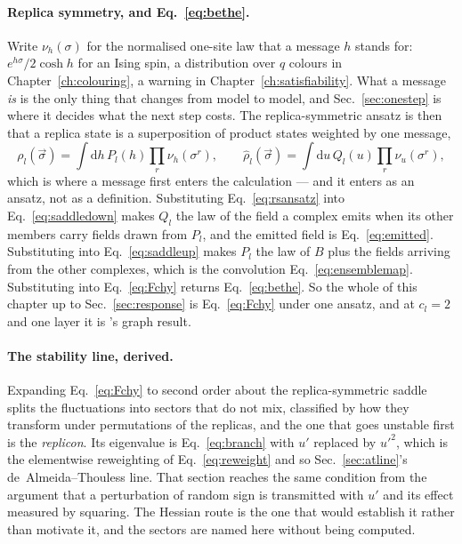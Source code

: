 \paragraph{Replica symmetry, and Eq.~\eqref{eq:bethe}.} Write
$\nu_{h}(\sigma)$ for the normalised one-site law that a message $h$ stands
for: $e^{h\sigma}/2\cosh h$ for an Ising spin, a distribution over $q$ colours
in Chapter~\ref{ch:colouring}, a warning in
Chapter~\ref{ch:satisfiability}. What a message \emph{is} is the only thing
that changes from model to model, and Sec.~\ref{sec:onestep} is where it decides
what the next step costs. The replica-symmetric ansatz is then that a replica
state is a superposition of product states weighted by one message,
\begin{equation}
  \rho_{l}(\vec\sigma)=\!\int\!\mathrm{d}h\,P_{l}(h)
    \prod_{r}\nu_{h}(\sigma^{r}),
  \qquad
  \hat\rho_{l}(\vec\sigma)=\!\int\!\mathrm{d}u\,Q_{l}(u)
    \prod_{r}\nu_{u}(\sigma^{r}),
  \label{eq:rsansatz}
\end{equation}
which is where a message first enters the calculation --- and it enters as an
ansatz, not as a definition. Substituting Eq.~\eqref{eq:rsansatz} into
Eq.~\eqref{eq:saddledown} makes $Q_{l}$ the law of the field a complex emits
when its other members carry fields drawn from $P_{l}$, and the emitted field is
Eq.~\eqref{eq:emitted}. Substituting into Eq.~\eqref{eq:saddleup} makes $P_{l}$
the law of $B$ plus the fields arriving from the other complexes, which is the
convolution Eq.~\eqref{eq:ensemblemap}. Substituting into Eq.~\eqref{eq:Fchy}
returns Eq.~\eqref{eq:bethe}. So the whole of this chapter up to
Sec.~\ref{sec:response} is Eq.~\eqref{eq:Fchy} under one ansatz, and at
$c_{l}=2$ and one layer it is \citeauthor{leone2002}'s graph result.

\paragraph{The stability line, derived.} Expanding Eq.~\eqref{eq:Fchy} to second
order about the replica-symmetric saddle splits the fluctuations into sectors
that do not mix, classified by how they transform under permutations of the
replicas, and the one that goes unstable first is the \emph{replicon}. Its
eigenvalue is Eq.~\eqref{eq:branch} with $u'$ replaced by $u'^{2}$, which is the
elementwise reweighting of Eq.~\eqref{eq:reweight} and so
Sec.~\ref{sec:atline}'s de~Almeida--Thouless line. That section reaches the same
condition from the argument that a perturbation of random sign is transmitted
with $u'$ and its effect measured by squaring. The Hessian route is the one that
would establish it rather than motivate it, and the sectors are named here
without being computed.

